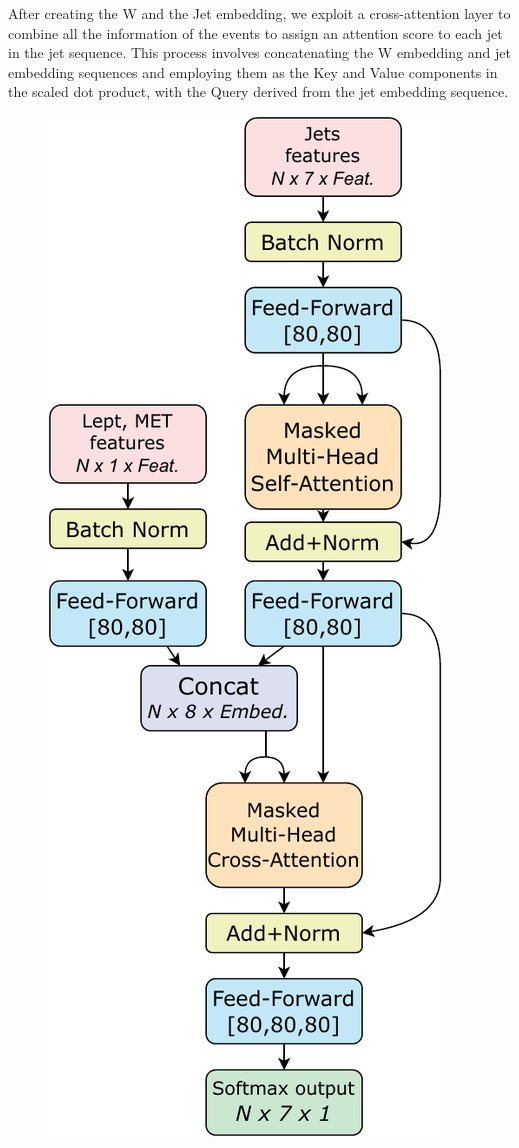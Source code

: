 After creating the W and the Jet embedding, we exploit a cross-attention layer to combine all the information of the events to assign an attention score to each jet in the jet sequence. This process involves concatenating the W embedding and jet embedding sequences and employing them as the Key and Value components in the scaled dot product, with the Query derived from the jet embedding sequence.

\begin{minipage}{0.33\linewidth}
\vspace{-1cm}
\begin{figure}[H]
    \raggedright
    \includegraphics[width=\linewidth]{fig//chap08-kin_reco/JPANet_1.pdf}

\end{figure}
\end{minipage}
